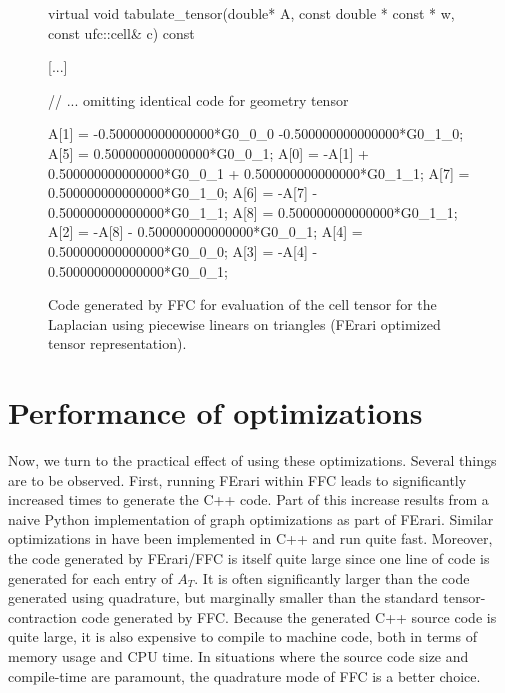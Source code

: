 \begin{figure}
  \scriptsize
  \begin{c++}
virtual void tabulate_tensor(double* A,
                             const double * const * w,
                             const ufc::cell& c) const
{
  [...]

  // ... omitting identical code for geometry tensor

  A[1] = -0.500000000000000*G0_0_0
         -0.500000000000000*G0_1_0;
  A[5] = 0.500000000000000*G0_0_1;
  A[0] = -A[1] +
         0.500000000000000*G0_0_1 +
         0.500000000000000*G0_1_1;
  A[7] = 0.500000000000000*G0_1_0;
  A[6] = -A[7] - 0.500000000000000*G0_1_1;
  A[8] = 0.500000000000000*G0_1_1;
  A[2] = -A[8] - 0.500000000000000*G0_0_1;
  A[4] = 0.500000000000000*G0_0_0;
  A[3] = -A[4] - 0.500000000000000*G0_0_1;
}
  \end{c++}
  \caption{Code generated by FFC for evaluation of the cell tensor for
    the Laplacian using piecewise linears on triangles (FErari
    optimized tensor representation).}
  \label{fig:code,poisson,optimized}
\end{figure}

\section{Performance of optimizations}

Now, we turn to the practical effect of using these optimizations.
Several things are to be observed. First, running FErari within FFC
leads to significantly increased times to generate the C++ code. Part
of this increase results from a naive Python implementation of graph
optimizations as part of FErari. Similar optimizations
in \citet{WolfHeath2009} have been implemented in C++ and run quite
fast. Moreover, the code generated by FErari/FFC is itself quite large
since one line of code is generated for each entry of $A_T$. It is
often significantly larger than the code generated using quadrature,
but marginally smaller than the standard tensor-contraction code
generated by FFC. Because the generated C++ source code is quite
large, it is also expensive to compile to machine code, both in terms
of memory usage and CPU time. In situations where the source code size
and compile-time are paramount, the quadrature mode of FFC is a better
choice.


